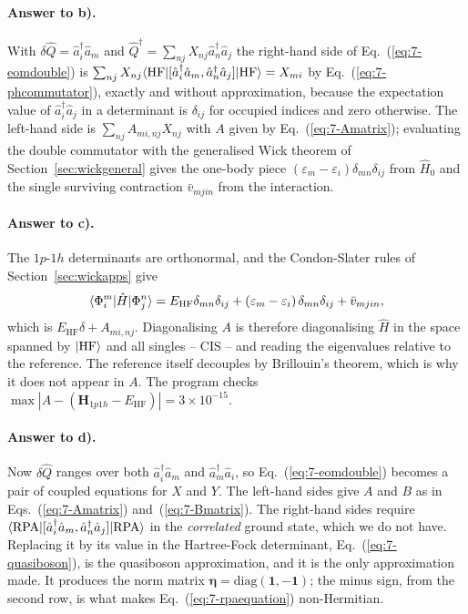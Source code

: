\paragraph{Answer to b).}
With $\delta\hat{Q}=\hat{a}^{\dagger}_{i}\hat{a}_{m}$ and
$\hat{Q}^{\dagger}=\sum_{nj}X_{nj}\hat{a}^{\dagger}_{n}\hat{a}_{j}$ the
right-hand side of Eq.~(\ref{eq:7-eomdouble}) is
$\sum_{nj}X_{nj}\langle \mathrm{HF} | [\hat{a}^{\dagger}_{i}\hat{a}_{m},
\hat{a}^{\dagger}_{n}\hat{a}_{j}] | \mathrm{HF} \rangle=X_{mi}$ by
Eq.~(\ref{eq:7-phcommutator}), exactly and without approximation, because the
expectation value of $\hat{a}^{\dagger}_{i}\hat{a}_{j}$ in a determinant is
$\delta_{ij}$ for occupied indices and zero otherwise.  The left-hand side is
$\sum_{nj}A_{mi,nj}X_{nj}$ with $A$ given by
Eq.~(\ref{eq:7-Amatrix}); evaluating the double commutator with the
generalised Wick theorem of Section~\ref{sec:wickgeneral} gives the one-body
piece $(\varepsilon_m-\varepsilon_i)\delta_{mn}\delta_{ij}$ from $\hat{H}_0$
and the single surviving contraction $\bar{v}_{mjin}$ from the interaction.

\paragraph{Answer to c).}
The $1p$-$1h$ determinants are orthonormal, and the Condon-Slater rules of
Section~\ref{sec:wickapps} give
\begin{equation}
  \langle \Phi^m_i | \hat{H} | \Phi^n_j \rangle
  = E_{\mathrm{HF}}\delta_{mn}\delta_{ij}
  + \left(\varepsilon_m-\varepsilon_i\right)\delta_{mn}\delta_{ij}
  + \bar{v}_{mjin},
  \label{eq:7-exc1}
\end{equation}
which is $E_{\mathrm{HF}}\delta+A_{mi,nj}$.  Diagonalising $A$ is therefore
diagonalising $\hat{H}$ in the space spanned by $\vert \mathrm{HF} \rangle$ and all
singles -- CIS -- and reading the eigenvalues relative to the reference.  The
reference itself decouples by Brillouin's theorem, which is why it does not
appear in $A$.  The program checks
$\max|A-(\bm{H}_{1p1h}-E_{\mathrm{HF}})| = 3\times10^{-15}$.

\paragraph{Answer to d).}
Now $\delta\hat{Q}$ ranges over both
$\hat{a}^{\dagger}_{i}\hat{a}_{m}$ and $\hat{a}^{\dagger}_{m}\hat{a}_{i}$, so
Eq.~(\ref{eq:7-eomdouble}) becomes a pair of coupled equations for $X$ and
$Y$.  The left-hand sides give $A$ and $B$ as in
Eqs.~(\ref{eq:7-Amatrix}) and~(\ref{eq:7-Bmatrix}).  The right-hand sides
require
$\langle \mathrm{RPA} | [\hat{a}^{\dagger}_{i}\hat{a}_{m},
\hat{a}^{\dagger}_{n}\hat{a}_{j}] | \mathrm{RPA} \rangle$ in the \emph{correlated}
ground state, which we do not have.  Replacing it by its value in the
Hartree-Fock determinant, Eq.~(\ref{eq:7-quasiboson}), is the quasiboson
approximation, and it is the only approximation made.  It produces the norm
matrix $\bm{\eta}=\mathrm{diag}(\bm{1},-\bm{1})$; the minus sign, from the
second row, is what makes Eq.~(\ref{eq:7-rpaequation}) non-Hermitian.

